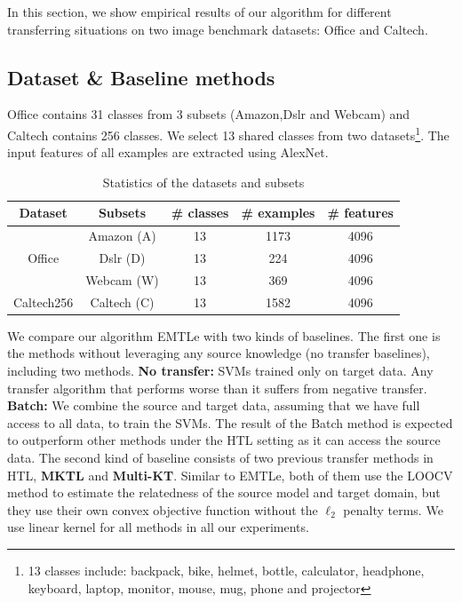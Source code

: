 In this section, we show empirical results of our algorithm for different transferring situations on two image benchmark datasets: Office and Caltech.
\subsection{Dataset \& Baseline methods}
Office contains 31 classes from 3 subsets (Amazon,Dslr and Webcam) and Caltech contains 256 classes. We select 13 shared classes from two datasets\footnote{13 classes include: backpack, bike, helmet, bottle, calculator, headphone, keyboard, laptop, monitor, mouse, mug, phone and projector}. The input features of all examples are extracted using AlexNet\cite{krizhevsky2012imagenet}.
\begin{table}[htbp]
	\centering
	\caption{Statistics of the datasets and subsets}
	\begin{tabular}{|c|c|c|c|c|}
		\hline
		Dataset&Subsets&\# classes &\# examples & \# features\\\hline
		\multirow{3}{*}{Office} & Amazon (A) &13&1173 & 4096\\
		
		& Dslr (D) &13&224 & 4096\\
		& Webcam (W) &13&369 & 4096\\
		\hline
		Caltech256&Caltech (C)&13&1582&4096\\
		\hline
	\end{tabular}%
	\label{tab:class_info}%
\end{table}%
We compare our algorithm EMTLe with two kinds of baselines. The first one is the methods without leveraging any source knowledge (no transfer baselines), including two methods. \textbf{No transfer:} SVMs trained only on target data. Any transfer algorithm that performs worse than it suffers from negative transfer. \textbf{Batch:} We combine the source and target data, assuming that we have full access to all data, to train the SVMs. The result of the Batch method is expected to outperform other methods under the HTL setting as it can access the source data. The second kind of baseline consists of two previous transfer methods in HTL, \textbf{MKTL\cite{jie2011multiclass}} and \textbf{Multi-KT\cite{tommasi2014learning}}. Similar to EMTLe, both of them use the LOOCV method to estimate the relatedness of the source model and target domain, but they use their own convex objective function without the $\ell_2$ penalty terms. We use linear kernel for all methods in all our experiments.
